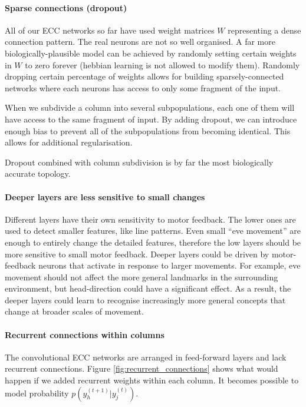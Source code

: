 \documentclass[12pt]{article}
\begin{document}
\paragraph{Sparse connections (dropout)} All of our ECC networks so far have used weight matrices $W$ representing a dense connection pattern. The real neurons are not so well organised. A far more biologically-plausible model can be achieved by randomly setting certain weights in $W$ to zero forever (hebbian learning is not allowed to modify them). 
Randomly dropping certain percentage of weights allows for building sparsely-connected networks where each neurons has access to only some fragment of the input. 

When we subdivide a column into several subpopulations, each one of them will have access to the same fragment of input. By adding dropout, we can introduce enough bias to prevent all of the subpopulations from becoming identical. This allows for additional regularisation.

Dropout combined with column subdivision is by far the most biologically accurate topology.

\paragraph{Deeper layers are less sensitive to small changes} 
Different layers have their own sensitivity to motor feedback. The lower ones are used to detect smaller features, like line patterns. Even small ``eve movement'' are enough to entirely change the detailed features, therefore the low layers should be more sensitive to small motor feedback. Deeper layers could be driven by motor-feedback neurons that activate in response to larger movements. For example, eve movement should not affect the more general landmarks in the surrounding environment, but head-direction could have a significant effect. As a result, the deeper  layers could learn to recognise increasingly more general concepts that change at broader scales of movement. 

\paragraph{Recurrent connections within columns}
The convolutional ECC networks are arranged in feed-forward layers and lack recurrent connections. Figure \ref{fig:recurrent_connections} shows what would happen if we added recurrent weights within each column. It becomes possible to model probability $p(y_h^{(t+1)}|y_j^{(t)})$. 
\end{document}
